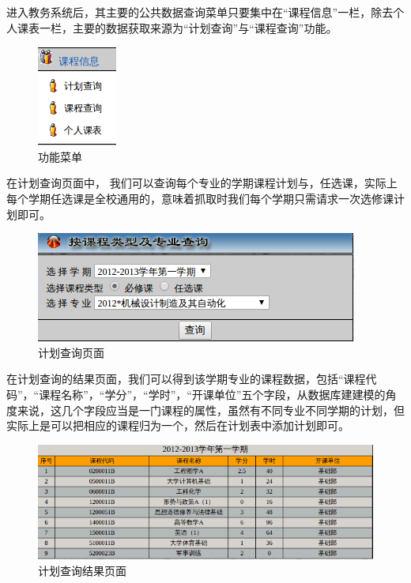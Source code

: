 \documentclass[UTF8, zihao=-4]{ctexart}
\begin{document}
    进入教务系统后，其主要的公共数据查询菜单只要集中在“课程信息”一栏，除去个人课表一栏，主要的数据获取来源为“计划查询”与“课程查询”功能。\par
    
    \begin{figure}
        \centering
        \includegraphics[width=0.5\linewidth]{figure/interface-menu}
        \caption{功能菜单}
        \label{fig:interface-menu}
    \end{figure}
    
    在计划查询页面中， 我们可以查询每个专业的学期课程计划与，任选课，实际上每个学期任选课是全校通用的，意味着抓取时我们每个学期只需请求一次选修课计划即可。\par
    
    \begin{figure}
        \centering
        \includegraphics[width=0.5\linewidth]{figure/interface-plan}
        \caption{计划查询页面}
        \label{fig:interface-plan}
    \end{figure}
    
    在计划查询的结果页面，我们可以得到该学期专业的课程数据，包括“课程代码”，“课程名称”，“学分”，“学时”，“开课单位”五个字段，从数据库建建模的角度来说，这几个字段应当是一门课程的属性，虽然有不同专业不同学期的计划，但实际上是可以把相应的课程归为一个，然后在计划表中添加计划即可。\par

    \begin{figure}
        \centering
        \includegraphics[width=0.5\linewidth]{figure/interface-plan-result}
        \caption{计划查询结果页面}
        \label{fig:interface-plan-result}
    \end{figure}
    
\end{document}
